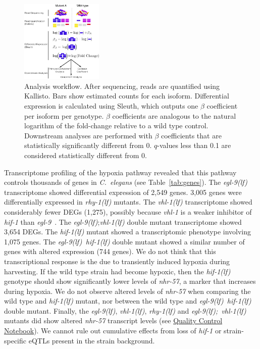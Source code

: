 \documentclass[9pt,twocolumn,twoside]{pnas-new}
\newcommand{\cel}{\emph{C.~elegans}}
\newcommand{\gene}[1]{\mbox{\emph{#1}}}
\newcommand{\egl}{\gene{egl-9(lf)}}
\newcommand{\rhy}{\gene{rhy-1(lf)}}
\newcommand{\vhl}{\gene{vhl-1(lf)}}
\newcommand{\eglvhl}{\gene{egl-9(lf); vhl-1(lf)}}
\newcommand{\eglhif}{\gene{egl-9(lf) hif-1(lf)}}
\newcommand{\hif}{\gene{hif-1(lf)}}
\newcommand{\egln}{2,549}
\newcommand{\rhyn}{3,005}
\newcommand{\vhln}{1,275}
\newcommand{\eglvhln}{3,654}
\newcommand{\hifn}{1,075}
\newcommand{\eglhifn}{744}
\begin{document}
\begin{figure}[tbhp]
  \centering
  \includegraphics[width=0.35\textwidth]{../figs/meaningofbeta.pdf}
  \caption{
    Analysis workflow. After sequencing, reads are quantified using Kallisto.
    Bars show estimated counts for each isoform. Differential expression is
    calculated using Sleuth, which outputs one $\beta$ coefficient per isoform
    per genotype. $\beta$ coefficients are analogous to the natural logarithm of
    the fold-change relative to a wild type control. Downstream analyses are
    performed with $\beta$ coefficients that are statistically significantly
    different from 0. $q$-values less than 0.1 are considered statistically
    different from 0.
  }
\label{fig:explain}
\end{figure}

Transcriptome profiling of the hypoxia pathway revealed that this pathway
controls thousands of genes in \cel{} (see Table~\ref{tab:genes}). The \egl{}
transcriptome showed differential expression of \egln{} genes. \rhyn{} genes
were differentially expressed in \rhy{} mutants. The \vhl{} transcriptome showed
considerably fewer DEGs (\vhln{}), possibly because \gene{vhl-1} is a weaker
inhibitor of \gene{hif-1} than \gene{egl-9}~\cite{Shao2009}. The \egl{};\vhl{}
double mutant transcriptome showed \eglvhln{} DEGs. The \hif{} mutant showed a
transcriptomic phenotype involving \hifn{} genes. The \eglhif{} double mutant
showed a similar number of genes with altered expression (\eglhifn{} genes).
\color{purple}
We do not think that this transcriptional response is the due to transiently
induced hypoxia during harvesting. If the wild type strain had become hypoxic,
then the \hif{} genotype should show significantly lower
levels of \gene{nhr-57}, a marker that increases during hypoxia.
We do not observe altered levels of \gene{nhr-57} when comparing
the wild type and \hif{} mutant, nor between the wild type and \eglhif{} double
mutant. Finally, the \egl{}, \vhl{}, \rhy{} and \eglvhl{} mutants did show
altered \gene{nhr-57} transcript levels (see
\href{https://wormlabcaltech.github.io/mprsq/analysis_notebooks/5_quality_check.html}{
Quality Control Notebook}). We cannot rule out
cumulative effects from loss of \gene{hif-1} or strain-specific eQTLs
present in the strain background.
\color{black}
\end{document}
